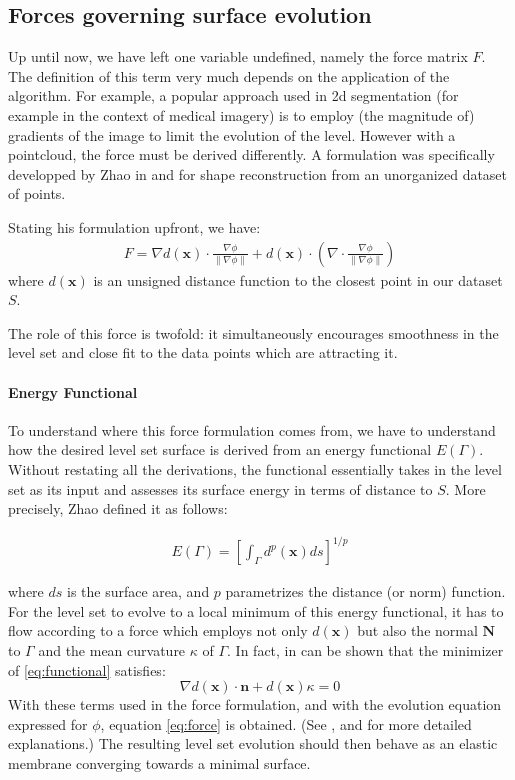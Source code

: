 \documentclass{article}
\begin{document}
\subsection{Forces governing surface evolution}
Up until now, we have left one variable undefined, namely the force matrix $F$.
The definition of this term very much depends on the application of the
algorithm. For example, a popular approach used in 2d segmentation (for example
in the context of medical imagery) is to employ (the magnitude of) gradients of
the image to limit the evolution of the level. However with a pointcloud, the
force must be derived differently. A formulation was specifically developped by
Zhao in \cite{zhao2000implicit} and \cite{zhao2001fast} for shape reconstruction from an
unorganized dataset of points.

Stating his formulation upfront, we have:
\begin{align}
    \label{eq:force}
    F = \nabla d(\mathbf{x}) \cdot \frac{\nabla \phi}{\| \nabla \phi \|}
+ d(\mathbf{x}) \cdot (\nabla \cdot \frac{\nabla \phi}{\| \nabla \phi \|} )
\end{align}
where $d(\mathbf{x})$ is an unsigned distance function to the closest point in
our dataset $S$.

The role of this force is twofold: it simultaneously encourages smoothness in
the level set and close fit to the data points which are attracting it.

\paragraph{Energy Functional}
To understand where this force formulation comes from, we have to understand how
the desired level set surface is derived from an energy functional $E(\Gamma)$.
Without restating all the derivations, the functional essentially takes in the
level set as its input and assesses its surface energy in terms of distance to
$S$. More precisely, Zhao\cite{zhao2000implicit} defined it as follows:

\begin{align}
    \label{eq:functional}
    E(\Gamma) = [\int_\Gamma d^p(\mathbf{x}) ds]^{1/p}
\end{align}

where $ds$ is the surface area, and $p$ parametrizes the distance (or norm)
function. For the level set to evolve to a local minimum of this energy
functional, it has to flow according to a force which employs not only
$d(\mathbf{x})$ but also the normal $\mathbf{N}$ to $\Gamma$ and the mean
curvature $\kappa$ of $\Gamma$. In fact, in can be shown that the minimizer of
\eqref{eq:functional} satisfies:
\[
\nabla d(\mathbf{x}) \cdot \mathbf{n} + d(\mathbf{x}) \kappa = 0
\]
With these terms used in the force formulation, and with the evolution equation
expressed for $\phi$, equation \eqref{eq:force} is obtained. (See \cite{zhao2000implicit},
\cite{zhao2001fast} and \cite{savadjiev2003surface} for more detailed
explanations.) The resulting level set evolution should then behave as an
elastic membrane converging towards a minimal surface.
\end{document}
